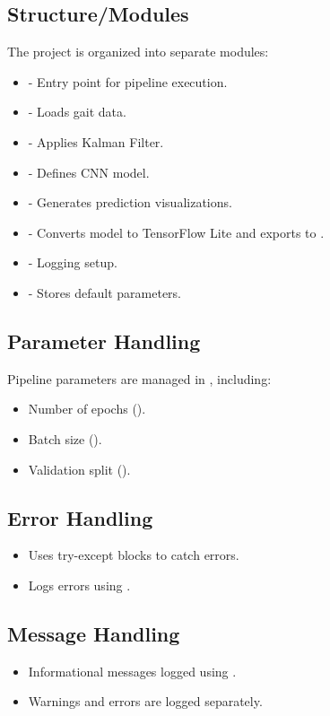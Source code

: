 \subsection{Structure/Modules}
The project is organized into separate modules:
\begin{itemize}
	\item {} - Entry point for pipeline execution.
	\item {} - Loads gait data.
	\item {} - Applies Kalman Filter.
	\item {} - Defines CNN model.
	\item {} - Generates prediction visualizations.
	\item {} - Converts model to TensorFlow Lite and exports to .
	\item {} - Logging setup.
	\item {} - Stores default parameters.
\end{itemize}

\subsection{Parameter Handling}
Pipeline parameters are managed in , including:
\begin{itemize}
	\item Number of epochs ().
	\item Batch size ().
	\item Validation split ().
\end{itemize}

\subsection{Error Handling}
\begin{itemize}
	\item Uses try-except blocks to catch errors.
	\item Logs errors using .
\end{itemize}

\subsection{Message Handling}
\begin{itemize}
	\item Informational messages logged using .
	\item Warnings and errors are logged separately.
\end{itemize}

